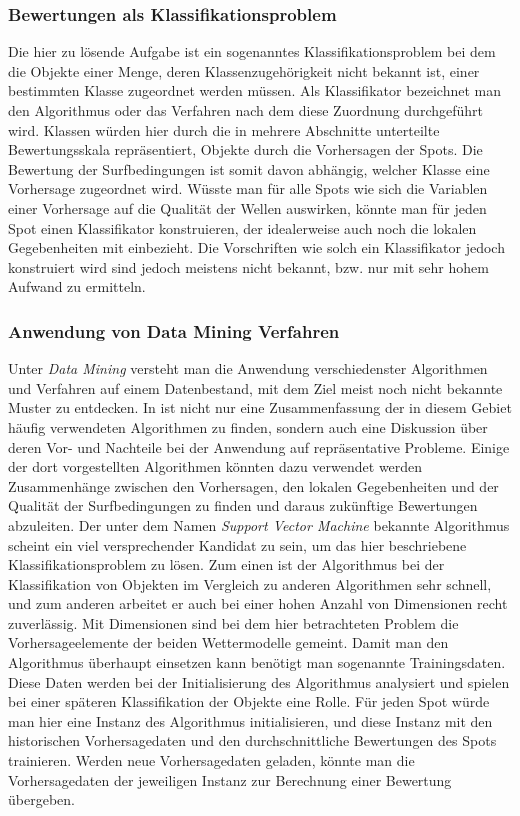 \subsubsection{Bewertungen als Klassifikationsproblem}
Die hier zu lösende Aufgabe ist ein sogenanntes Klassifikationsproblem
bei dem die Objekte einer Menge, deren Klassenzugehörigkeit nicht
bekannt ist, einer bestimmten Klasse zugeordnet werden müssen. Als
Klassifikator bezeichnet man den Algorithmus oder das Verfahren nach
dem diese Zuordnung durchgeführt wird. Klassen würden hier durch die
in mehrere Abschnitte unterteilte Bewertungsskala repräsentiert,
Objekte durch die Vorhersagen der Spots. Die Bewertung der
Surfbedingungen ist somit davon abhängig, welcher Klasse eine
Vorhersage zugeordnet wird. Wüsste man für alle Spots wie sich die
Variablen einer Vorhersage auf die Qualität der Wellen auswirken,
könnte man für jeden Spot einen Klassifikator konstruieren, der
idealerweise auch noch die lokalen Gegebenheiten mit einbezieht. Die
Vorschriften wie solch ein Klassifikator jedoch konstruiert wird sind
jedoch meistens nicht bekannt, bzw. nur mit sehr hohem Aufwand zu
ermitteln.

\subsubsection{Anwendung von Data Mining Verfahren}
Unter \textit{Data Mining} versteht man die Anwendung verschiedenster
Algorithmen und Verfahren auf einem Datenbestand, mit dem Ziel meist
noch nicht bekannte Muster zu entdecken. In \cite{Seagaran2007} ist
nicht nur eine Zusammenfassung der in diesem Gebiet häufig verwendeten
Algorithmen zu finden, sondern auch eine Diskussion über deren Vor-
und Nachteile bei der Anwendung auf repräsentative Probleme. Einige
der dort vorgestellten Algorithmen könnten dazu verwendet werden
Zusammenhänge zwischen den Vorhersagen, den lokalen Gegebenheiten und
der Qualität der Surfbedingungen zu finden und daraus zukünftige
Bewertungen abzuleiten. Der unter dem Namen \textit{Support Vector
  Machine} bekannte Algorithmus scheint ein viel versprechender
Kandidat zu sein, um das hier beschriebene Klassifikationsproblem zu
lösen. Zum einen ist der Algorithmus bei der Klassifikation von
Objekten im Vergleich zu anderen Algorithmen sehr schnell, und zum
anderen arbeitet er auch bei einer hohen Anzahl von Dimensionen recht
zuverlässig. Mit Dimensionen sind bei dem hier betrachteten Problem
die Vorhersageelemente der beiden Wettermodelle gemeint. Damit man den
Algorithmus überhaupt einsetzen kann benötigt man sogenannte
Trainingsdaten. Diese Daten werden bei der Initialisierung des
Algorithmus analysiert und spielen bei einer späteren Klassifikation
der Objekte eine Rolle. Für jeden Spot würde man hier eine Instanz des
Algorithmus initialisieren, und diese Instanz mit den historischen
Vorhersagedaten und den durchschnittliche Bewertungen des Spots
trainieren. Werden neue Vorhersagedaten geladen, könnte man die
Vorhersagedaten der jeweiligen Instanz zur Berechnung einer Bewertung
übergeben.

